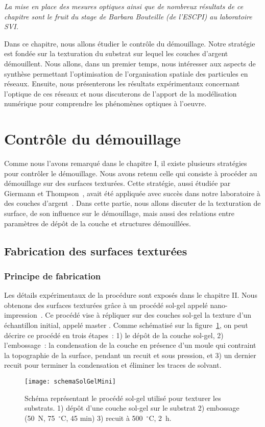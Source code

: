 \minitoc
\newpage

\textit{La mise en place des mesures optiques ainsi que de nombreux résultats de ce chapitre sont le fruit du stage de Barbara Bouteille (de l'ESCPI) au laboratoire SVI.}\par 
Dans ce chapitre, nous allons étudier le contrôle du démouillage. Notre stratégie est fondée sur la texturation du substrat sur lequel les couches d'argent démouillent. Nous allons, dans un premier temps, nous intéresser aux aspects de synthèse permettant l'optimisation de l'organisation spatiale des particules en réseaux. Ensuite, nous présenterons les résultats expérimentaux concernant l'optique de ces réseaux et nous discuterons de l'apport de la modélisation numérique pour comprendre les phénomènes optiques à l'oeuvre.

\section{Contrôle du démouillage}
Comme nous l'avons remarqué dans le chapitre I, il existe plusieurs stratégies pour contrôler le démouillage. Nous avons retenu celle qui consiste à procéder au démouillage sur des surfaces texturées. Cette stratégie, aussi étudiée par Giermann et Thompson~\cite{giermann2005solid, giermann2011requirements}, avait été appliquée avec succès dans notre laboratoire à des couches d'argent~\cite{le2014self}. Dans cette partie, nous allons discuter de la texturation de surface, de son influence sur le démouillage, mais aussi des relations entre paramètres de dépôt de la couche et structures démouillées.\par 

	\subsection{Fabrication des surfaces texturées}
	\subsubsection{Principe de fabrication}
Les détails expérimentaux de la procédure sont exposés dans le chapitre II. Nous obtenons des surfaces texturées grâce à un procédé sol-gel appelé nano-impression~\cite{le2014self,chou1996nanoimprint}. Ce procédé vise à répliquer sur des couches sol-gel la texture d'un échantillon initial, appelé \og master \fg. Comme schématisé sur la figure~\ref{schemaSolGelMini}, on peut décrire ce procédé en trois étapes~: 1) le dépôt de la couche sol-gel, 2) l'embossage~: la condensation de la couche en présence d'un moule qui contraint la topographie de la surface, pendant un recuit et sous pression, et 3) un dernier recuit pour terminer la condensation et éliminer les traces de solvant.
\begin{figure}[!htb]
\centering
\texttt{[image: schemaSolGelMini]}
\caption{Schéma représentant le procédé sol-gel utilisé pour texturer les substrats. 1) dépôt d'une couche sol-gel sur le substrat 2) embossage (50~N, 75~$^\circ$C, 45 min) 3) recuit à 500~$^\circ$C, 2~h.}
\label{schemaSolGelMini}
\end{figure}


